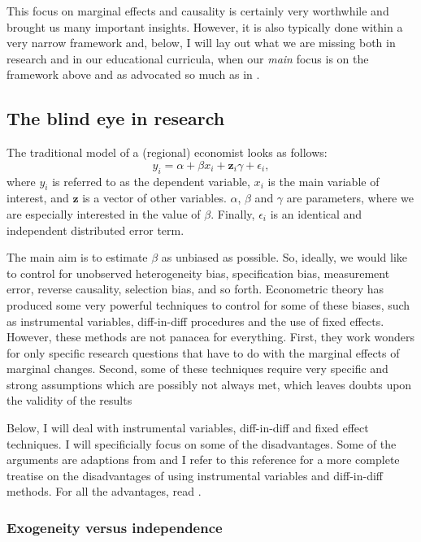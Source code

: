 \documentclass[fleqn,10pt]{SelfArx} %
\begin{document}
This focus on marginal effects and causality is
certainly very worthwhile and brought us many important insights. However, it is
also typically done within a very narrow framework and, below, I will lay out what we are missing both in
research and in our educational curricula, when our \emph{main} focus is on the
framework above and as advocated so much as in \citet{angrist2008mostly}.   

\subsection{The blind eye in research}

The traditional model of a (regional) economist looks as follows:
\begin{equation}
  \label{model_economist}
  y_i = \alpha + \beta x_i + \mathbf{z}_i\gamma + \epsilon_i,
\end{equation}
where $y_i$ is referred to as the dependent variable, $x_i$ is the main variable of
interest, and $\mathbf{z}$ is a vector of other variables. $\alpha$, $\beta$ and
$\gamma$ are parameters, where we are especially interested in the value of
$\beta$. Finally, $\epsilon_i$ is an identical and independent distributed error
term.

The main aim is to estimate $\beta$ as unbiased as possible. So, ideally, we
would like to control for unobserved heterogeneity bias, specification bias,
measurement error, reverse causality, selection bias, and so forth. Econometric
theory has produced some very powerful techniques to control for some of these
biases, such as instrumental variables, diff-in-diff procedures and the use of
fixed effects. However, these methods are not panacea for everything. First, they work
wonders for only specific research questions that have to do with the marginal effects of
marginal changes. Second, some of these techniques require very specific and
strong assumptions which are possibly not always met, which leaves doubts upon
the validity of the results 

Below, I will deal with instrumental variables, diff-in-diff and fixed effect
techniques. I will specificially focus on some of the disadvantages. Some of the
arguments are adaptions from \citet{deaton2010instruments} and I refer to this
reference for a more complete treatise on the disadvantages of using
instrumental variables and diff-in-diff methods. For all the advantages,
read \citet{angrist2008mostly}. 

\subsubsection{Exogeneity versus independence}
\end{document}
